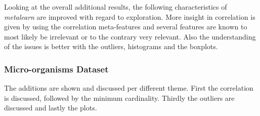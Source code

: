 \documentclass[10pt,a4paper]{report}
\begin{document}
	Looking at the overall additional results, the following characteristics of \textit{metalearn} are improved with regard to exploration. More insight in correlation is given by using the correlation meta-features and several features are known to most likely be irrelevant or to the contrary very relevant. Also the understanding of the issues is better with the outliers, histograms and the boxplots.
	
	\subsubsection{Micro-organisms Dataset}
	\label{DEsubsec:AdditionalResultMO}
	
	The additions are shown and discussed per different theme. First the correlation is discussed, followed by the minimum cardinality. Thirdly the outliers are discussed and lastly the plots.
	
\end{document}
